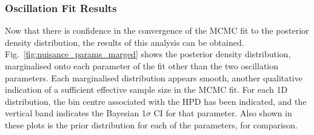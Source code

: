 
\subsubsection{Oscillation Fit Results}
Now that there is confidence in the convergence of the MCMC fit to the posterior density distribution, the results of this analysis can be obtained. Fig.~\ref{fig:nuisance_params_marged} shows the posterior density distribution, marginalised onto each parameter of the fit other than the two oscillation parameters. Each marginalised distribution appears smooth, another qualitative indication of a sufficient effective sample size in the MCMC fit. For each 1D distribution, the bin centre associated with the HPD has been indicated, and the vertical band indicates the Bayesian 1$\sigma$ CI for that parameter. Also shown in these plots is the prior distribution for each of the parameters, for comparison.

